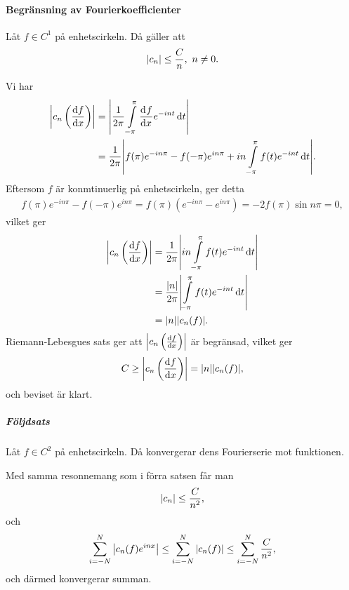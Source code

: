 \paragraph{Begränsning av Fourierkoefficienter}
Låt $f\in C^{1}$ på enhetscirkeln. Då gäller att
\begin{align*}
	\abs{c_{n}} \leq \frac{C}{n},\ n \neq 0.
\end{align*}

\proof
Vi har
\begin{align*}
	\abs{c_{n}\left(\dv{f}{x}\right)} &= \abs{\frac{1}{2\pi}\int\limits_{-\pi}^{\pi}\dv[]{f}{x} (t)e^{-int}\dd{t}} \\
	                                  &= \frac{1}{2\pi}\abs{f(\pi)e^{-in\pi} - f(-\pi)e^{in\pi} + in\int\limits_{-\pi}^{\pi}f(t)e^{-int}\dd{t}}.
\end{align*}
Eftersom $f$ är konmtinuerlig på enhetscirkeln, ger detta
\begin{align*}
	f(\pi)e^{-in\pi} - f(-\pi)e^{in\pi} = f(\pi)(e^{-in\pi} - e^{in\pi}) = -2f(\pi)\sin{n\pi} = 0,
\end{align*}
vilket ger
\begin{align*}
	\abs{c_{n}\left(\dv{f}{x}\right)} &= \frac{1}{2\pi}\abs{in\int\limits_{-\pi}^{\pi}f(t)e^{-int}\dd{t}} \\
	                                  &= \frac{\abs{n}}{2\pi}\abs{\int\limits_{-\pi}^{\pi}f(t)e^{-int}\dd{t}} \\
	                                  &= \abs{n}\abs{c_{n}(f)}.
\end{align*}
Riemann-Lebesgues sats ger att $\abs{c_{n}\left(\dv{f}{x}\right)}$ är begränsad, vilket ger
\begin{align*}
	C \geq \abs{c_{n}\left(\dv{f}{x}\right)} = \abs{n}\abs{c_{n}(f)},
\end{align*}
och beviset är klart.

\subparagraph{Följdsats}
Låt $f\in C^{2}$ på enhetscirkeln. Då konvergerar dens Fourierserie mot funktionen.

\proof
Med samma resonnemang som i förra satsen får man
\begin{align*}
	\abs{c_{n}} \leq \frac{C}{n^{2}},
\end{align*}
och
\begin{align*}
	\sum\limits_{i = -N}^{N}\abs{c_{n}(f)e^{inx}} \leq \sum\limits_{i = -N}^{N}\abs{c_{n}(f)} \leq \sum\limits_{i = -N}^{N}\frac{C}{n^{2}},
\end{align*}
och därmed konvergerar summan.


